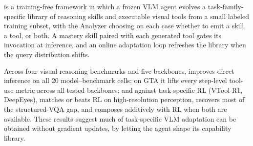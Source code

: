 \label{sec:conclusion}

\sysname{} is a training-free framework in which a frozen VLM agent evolves a
task-family-specific library of reasoning skills and executable visual tools from a small
labeled training subset, with the Analyzer choosing on each case whether
to emit a skill, a tool, or both. A mastery skill paired with each generated tool gates
its invocation at inference, and an online adaptation loop refreshes the library when the
query distribution shifts.

Across four visual-reasoning benchmarks and five backbones, \sysname{} improves direct
inference on all 20 model--benchmark cells; on GTA it lifts every step-level tool-use
metric across all tested backbones; and against task-specific RL (VTool-R1, DeepEyes),
\sysname{} matches or beats RL on high-resolution perception, recovers most of the
structured-VQA gap, and composes additively with RL when both are available. These
results suggest much of task-specific VLM adaptation can be obtained without gradient
updates, by letting the agent shape its capability library.
